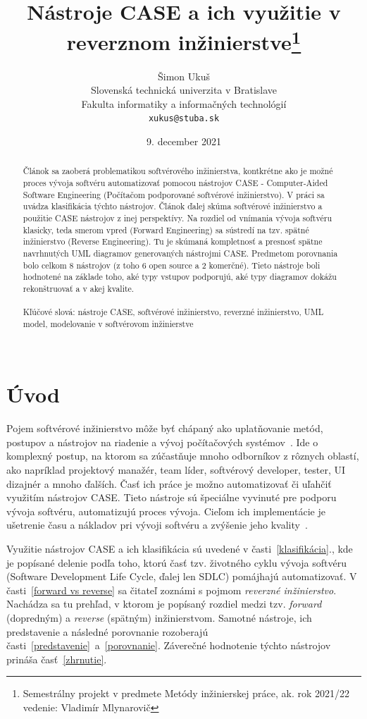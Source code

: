\documentclass[10pt,twoside,slovak,a4paper]{article}
\title{Nástroje CASE a ich využitie v reverznom inžinierstve\thanks{Semestrálny projekt v predmete Metódy inžinierskej práce, ak. rok 2021/22 vedenie: Vladimír Mlynarovič}} %
\author{Šimon Ukuš\\[2pt]
	{\small Slovenská technická univerzita v Bratislave}\\
	{\small Fakulta informatiky a informačných technológií}\\
	{\small \texttt{xukus@stuba.sk}}
	}
\date{\small 9. december 2021}
\begin{document}
\maketitle

\begin{abstract}
Článok sa zaoberá problematikou softvérového inžinierstva, kontkrétne ako je možné proces vývoja softvéru automatizovať pomocou nástrojov CASE - Computer-Aided Software Engineering (Počítačom podporované softvérové inžinierstvo). V práci sa uvádza klasifikácia týchto nástrojov.  Článok ďalej skúma softvérové inžinierstvo a použitie CASE nástrojov z inej perspektívy.  Na rozdiel od vnímania vývoja softvéru klasicky, teda smerom vpred (Forward Engineering) sa sústredí na tzv. spätné inžinierstvo (Reverse Engineering). Tu je skúmaná kompletnosť a presnosť spätne navrhnutých UML diagramov generovaných nástrojmi CASE. Predmetom porovnania bolo celkom 8 nástrojov (z toho 6 open source a 2 komerčné). Tieto nástroje boli hodnotené na základe toho, aké typy vstupov podporujú, aké typy diagramov dokážu rekonštruovať a v akej kvalite.
 \\
 \\
 Kľúčové slová: nástroje CASE, softvérové inžinierstvo, reverzné inžinierstvo, UML model, modelovanie v softvérovom inžinierstve
 \\
 \\
\end{abstract}


\section{Úvod}
Pojem softvérové inžinierstvo môže byť chápaný ako uplatňovanie metód, postupov a nástrojov na riadenie a vývoj počítačových systémov~\cite{1985}. Ide o komplexný postup, na ktorom sa zúčastňuje mnoho odborníkov z rôznych oblastí, ako napríklad projektový manažér, team líder, softvérový developer, tester, UI dizajnér a mnoho ďalších. Časť ich práce je možno automatizovať či uľahčiť využitím nástrojov CASE. Tieto nástroje sú špeciálne vyvinuté pre podporu vývoja softvéru, automatizujú proces vývoja. Cieľom ich implementácie je ušetrenie času a nákladov pri vývoji softvéru a zvýšenie jeho kvality~\cite{Osama:Adoption}.

Využitie nástrojov CASE a ich klasifikácia sú uvedené v časti~\ref{klasifikácia}., kde je popísané delenie podľa toho, ktorú časť tzv. životného cyklu vývoja softvéru (Software Development Life Cycle, ďalej len SDLC) pomájhajú automatizovať. 
V časti~\ref{forward vs reverse} sa čitateľ zoznámi s pojmom \emph{reverzné inžinierstvo}. Nachádza sa tu prehľad, v ktorom je popísaný rozdiel medzi tzv. \emph{forward} (dopredným) a \emph{reverse} (spätným) inžinierstvom. 
Samotné nástroje, ich predstavenie a následné porovnanie rozoberajú časti~\ref{predstavenie}~a~\ref{porovnanie}.
Záverečné hodnotenie týchto nástrojov prináša časť~\ref{zhrnutie}.
\end{document}
